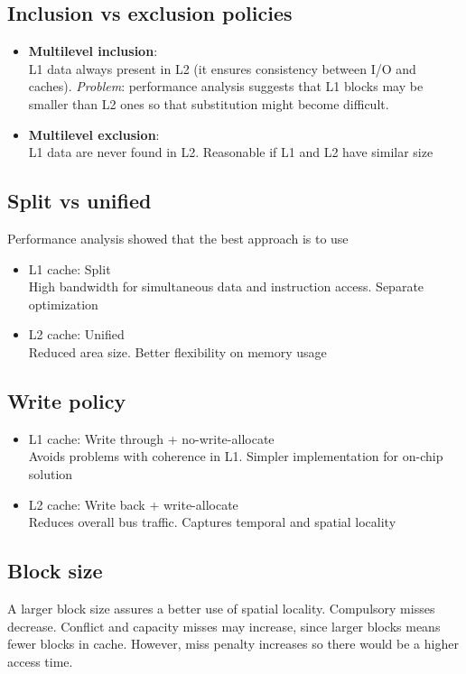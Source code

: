 \subsection{Inclusion vs exclusion policies}
\begin{itemize}
    \item \textbf{Multilevel inclusion}:\\
    L1 data always present in L2 (it ensures consistency between I/O and caches). \textit{Problem}: performance analysis suggests that L1 blocks may be smaller than L2 ones so that substitution might become difficult.
    \item \textbf{Multilevel exclusion}:\\
    L1 data are never found in L2. Reasonable if L1 and L2 have similar size
\end{itemize}

\subsection{Split vs unified}
Performance analysis showed that the best approach is to use
\begin{itemize}
    \item L1 cache: Split\\
    High bandwidth for simultaneous data and instruction access.
    Separate optimization
    \item L2 cache: Unified\\
    Reduced area size. Better flexibility on memory usage
\end{itemize}

\subsection{Write policy}
\begin{itemize}
    \item L1 cache: Write through + no-write-allocate\\
    Avoids problems with coherence in L1. Simpler implementation for on-chip solution
    \item L2 cache: Write back + write-allocate\\
    Reduces overall bus traffic. Captures temporal and spatial locality
\end{itemize}

\subsection{Block size}
A larger block size assures a better use of spatial locality.
Compulsory misses decrease. Conflict and capacity misses may increase, since larger blocks means fewer blocks in cache. However, miss penalty increases so there would be a higher access time.

